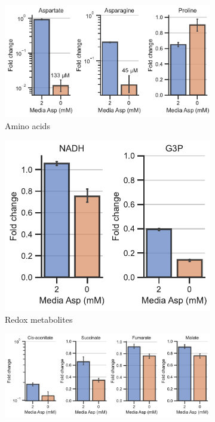 \begin{figure}[!ht]
    \captionsetup{labelformat=empty}
    \centering
    \begin{subfigure}[b]{0.45\textwidth}
        \includegraphics[width=\textwidth]{figures/sapp/GOT_DKO_Asp_depl/143B_GOT_AA.pdf}
        \caption{Amino acids}
        \label{fig:sapp:143B_GOT_AA}
    \end{subfigure}
    \hfill
    \begin{subfigure}[b]{0.30\textwidth}
        \includegraphics[width=\textwidth]{figures/sapp/GOT_DKO_Asp_depl/143B_GOT_rd.pdf}
        \caption{Redox metabolites}
        \label{fig:sapp:143B_GOT_rd}
    \end{subfigure}
    \hfill
    \begin{subfigure}[b]{0.6\textwidth}
        \includegraphics[width=\textwidth]{figures/sapp/GOT_DKO_Asp_depl/143B_GOT_tca.pdf}

\end{subfigure}
\end{figure}
